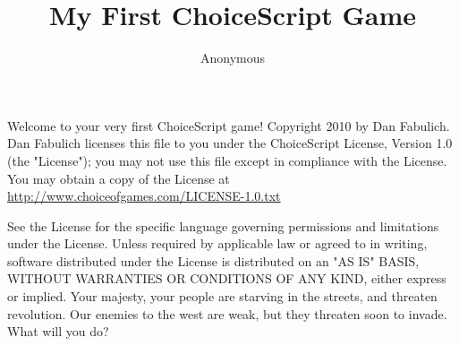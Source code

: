 \documentclass{book}
\begin{document}
\date{}
\title{
My
First
ChoiceScript
Game
}\author{
Anonymous
}\maketitle
Welcome
to
your
very
first
ChoiceScript
game!
Copyright
2010
by
Dan
Fabulich.
Dan
Fabulich
licenses
this
file
to
you
under
the
ChoiceScript
License,
Version
1.0
(the
"License");
you
may
not
use
this
file
except
in
compliance
with
the
License.
You
may
obtain
a
copy
of
the
License
at
\url{http://www.choiceofgames.com/LICENSE-1.0.txt}

See
the
License
for
the
specific
language
governing
permissions
and
limitations
under
the
License.
Unless
required
by
applicable
law
or
agreed
to
in
writing,
software
distributed
under
the
License
is
distributed
on
an
"AS
IS"
BASIS,
WITHOUT
WARRANTIES
OR
CONDITIONS
OF
ANY
KIND,
either
express
or
implied.
\cleardoublepage
Your
majesty,
your
people
are
starving
in
the
streets,
and
threaten
revolution.
Our
enemies
to
the
west
are
weak,
but
they
threaten
soon
to
invade.
What
will
you
do?
\end{document}
